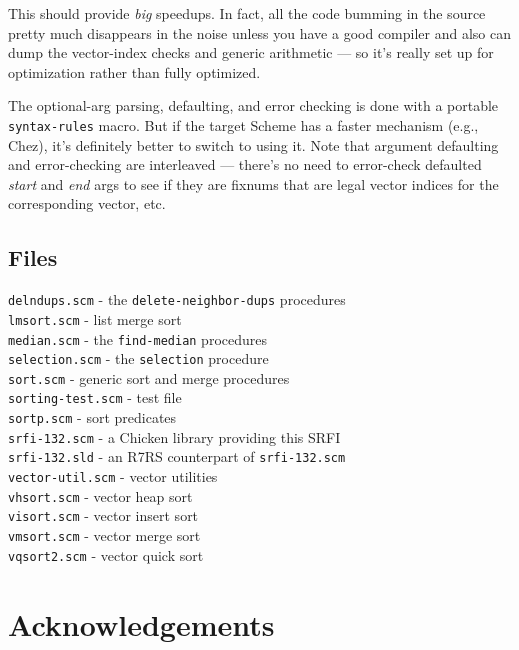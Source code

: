 This should provide \emph{big} speedups. In fact, all the code bumming
in the source pretty much disappears in the noise unless you have a good
compiler and also can dump the vector-index checks and generic
arithmetic --- so it's really set up for optimization rather than fully
optimized.

The optional-arg parsing, defaulting, and error checking is done with a
portable \texttt{syntax-rules} macro. But if the target Scheme has a
faster mechanism (e.g., Chez), it's definitely better to switch to using
it. Note that argument defaulting and error-checking are interleaved ---
there's no need to error-check defaulted \emph{start} and \emph{end}
args to see if they are fixnums that are legal vector indices for the
corresponding vector, etc.

\subsection{Files}\label{Files}

\texttt{delndups.scm} - the \texttt{delete-neighbor-dups} procedures\\
\texttt{lmsort.scm} - list merge sort\\
\texttt{median.scm} - the \texttt{find-median} procedures\\
\texttt{selection.scm} - the \texttt{selection} procedure\\
\texttt{sort.scm} - generic sort and merge procedures\\
\texttt{sorting-test.scm} - test file\\
\texttt{sortp.scm} - sort predicates\\
\texttt{srfi-132.scm} - a Chicken library providing this SRFI\\
\texttt{srfi-132.sld} - an R7RS counterpart of \texttt{srfi-132.scm}\\
\texttt{vector-util.scm} - vector utilities\\
\texttt{vhsort.scm} - vector heap sort\\
\texttt{visort.scm} - vector insert sort\\
\texttt{vmsort.scm} - vector merge sort\\
\texttt{vqsort2.scm} - vector quick sort\\

\section{Acknowledgements}\label{acknowledgements}

